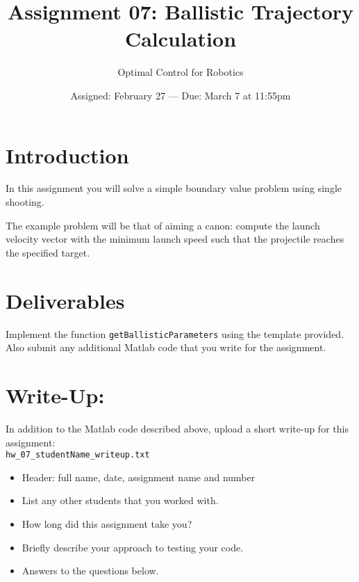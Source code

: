 

\title{Assignment 07:  Ballistic Trajectory Calculation}
\date{Assigned:  February 27  ---  Due:  March 7 at 11:55pm}
\author{Optimal Control for Robotics}

\maketitle

\section*{Introduction}

In this assignment you will solve a simple boundary value problem using single shooting.

The example problem will be that of aiming a canon:
compute the launch velocity vector with the minimum launch speed
such that the projectile reaches the specified target.

\section*{Deliverables}

Implement the function \texttt{getBallisticParameters} using the template provided.
Also submit any additional Matlab code that you write for the assignment.

\section*{Write-Up:}

In addition to the Matlab code described above,
upload a short write-up for this assignment: \\
\texttt{hw\_07\_studentName\_writeup.txt}
\vspace{-0.0em} \begin{itemize}  \setlength\itemsep{0em} \setlength\itemindent{18pt}
  \item Header: full name, date, assignment name and number
  \item List any other students that you worked with.
  \item How long did this assignment take you?
  \item Briefly describe your approach to testing your code.
  \item Answers to the questions below.
\end{itemize}

